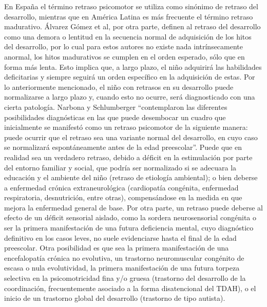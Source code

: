     En España el término retraso psicomotor se utiliza como sinónimo de retraso del desarrollo, mientras que en América Latina es más frecuente el término retraso madurativo. Álvarez Gómez et al, por otra parte, definen al retraso del desarrollo como una demora o lentitud en la secuencia normal de adquisición de los hitos del desarrollo, por lo cual para estos autores no existe nada intrínsecamente anormal, los hitos madurativos se cumplen en el orden esperado, sólo que en forma más lenta. Esto implica que, a largo plazo, el niño adquirirá las habilidades deficitarias y siempre seguirá un orden específico en la adquisición de estas.
    Por lo anteriormente mencionado, el niño con retrasos en su desarrollo puede normalizarse a largo plazo y, cuando esto no ocurre, será diagnosticado con una cierta patología. Narbona y Schlumberger “contemplaron las diferentes posibilidades diagnósticas en las que puede desembocar un cuadro que inicialmente se manifestó como un retraso psicomotor de la siguiente manera: puede ocurrir que el retraso sea una variante normal del desarrollo, en cuyo caso se normalizará espontáneamente antes de la edad preescolar”. Puede que en realidad sea un verdadero retraso, debido a déficit en la estimulación por parte del entorno familiar y social, que podría ser normalizado si se adecuara la educación y el ambiente del niño (retraso de etiología ambiental); o bien deberse a enfermedad crónica extraneurológica (cardiopatía congénita, enfermedad respiratoria, desnutrición, entre otras), compensándose en la medida en que mejora la enfermedad general de base. Por otra parte, un retraso puede deberse al efecto de un déficit sensorial aislado, como la sordera neurosensorial congénita o ser la primera manifestación de una futura deficiencia mental, cuyo diagnóstico definitivo en los casos leves, no suele evidenciarse hasta el final de la edad preescolar. Otra posibilidad es que sea la primera manifestación de una encefalopatía crónica no evolutiva, un trastorno neuromuscular congénito de escasa o nula evolutividad, la primera manifestación de una futura torpeza selectiva en la psicomotricidad fina y/o gruesa (trastorno del desarrollo de la coordinación, frecuentemente asociado a la forma disatencional del TDAH), o el inicio de un trastorno global del desarrollo (trastorno de tipo autista).
